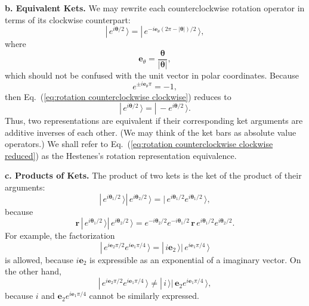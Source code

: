\documentclass[11pt,twocolumn]{article}
\begin{document}
\textbf{b.  Equivalent Kets.} We may rewrite each counterclockwise rotation operator in terms of its clockwise counterpart:  
\begin{equation}
\label{eq:rotation counterclockwise clockwise}
|\,e^{i\bm\theta/2}\,\rangle=|\,e^{-i\mathbf e_{\theta} (2\pi-|\bm\theta|)/2}\,\rangle,
\end{equation}
where
\begin{equation}
\label{eq:e_theta}
\mathbf e_\theta=\frac{\bm\theta}{|\bm\theta|},
\end{equation}
which should not be confused with the unit vector in polar coordinates.  Because
\begin{equation}
\label{eq:exp i e_theta pi is -1}
e^{\pm i\mathbf e_\theta\pi}=-1,
\end{equation}
then Eq.~(\ref{eq:rotation counterclockwise clockwise}) reduces to
\begin{equation}
\label{eq:rotation counterclockwise clockwise reduced}
|\,e^{i\bm\theta/2}\,\rangle=|\,-e^{i\bm\theta/2}\,\rangle.
\end{equation}
Thus, two representations are equivalent if their corresponding ket arguments are additive inverses of each other. (We may think of the ket bars as absolute value operators.)  We shall refer to Eq.~(\ref{eq:rotation counterclockwise clockwise reduced}) as the Hestenes's rotation representation equivalence.

\textbf{c.  Products of Kets.}  The product of two kets is the ket of the product of their arguments:
\begin{equation}
\label{eq:product of kets}
|\,e^{i\bm\theta_1/2}\,\rangle |\,e^{i\bm\theta_2/2}\,\rangle=|\,e^{i\bm\theta_1/2}e^{i\bm\theta_1/2}\,\rangle,
\end{equation}
because
\begin{equation}
\label{eq:product of kets exponential explanation}
\mathbf r\, |\,e^{i\bm\theta_1/2}\,\rangle |\,e^{i\bm\theta_2/2}\,\rangle=e^{-i\bm\theta_2/2}e^{-i\bm\theta_1/2}\,\mathbf r\,e^{i\bm\theta_1/2}e^{i\bm\theta_2/2}.
\end{equation}
For example, the factorization
\begin{equation}
\label{eq:i e_2 exp i e_1 pi over 4 factorization}
|\, e^{i\mathbf e_2\pi/2} e^{i\mathbf e_1\pi/4}\,\rangle
=|\,i \mathbf e_2\,\rangle |\,e^{i\mathbf e_1\pi/4}\,\rangle
\end{equation}
is allowed, because $i\mathbf e_2$ is expressible as an exponential of a imaginary vector.  On the other hand, 
\begin{equation}
\label{eq:ie_2 exp ie_1 pi over 4 factorization false}
|\, e^{i\mathbf e_2\pi/2} e^{i\mathbf e_1\pi/4} \,\rangle \neq |\, i \,\rangle |\, \mathbf e_2e^{i\mathbf e_1\pi/4} \,\rangle,
\end{equation}
because $i$ and ${\mathbf e_2}e^{i\mathbf e_1\pi/4}$ cannot be similarly expressed.  
\end{document}
